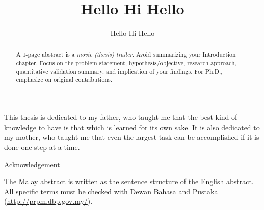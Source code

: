 \documentclass[oneside]{utmthesis}
\begin{document}
\title{Hello Hi Hello}
\author{Hello Hi Hello}

\coverpage
\superpage
\certification
\frontmatter
\maketitle
\declaration


\begin{dedication}
This thesis is dedicated to my father, who taught me that the best kind of knowledge to have is that which is learned for its own sake. It is also dedicated to my mother, who taught me that even the largest task can be accomplished if it is done one step at a time.\
\end{dedication}

\begin{acknowledgement}
Acknowledgement
\end{acknowledgement}


\begin{abstract}
A 1-page abstract is a \emph{movie (thesis) trailer}. Avoid summarizing
your Introduction chapter. Focus on the problem statement, hypothesis/objective,
research approach, quantitative validation summary, and implication
of your findings. For Ph.D., emphasize on original contributions.
\end{abstract}

\begin{abstrak}
The Malay abstract is written as the sentence structure of the English
abstract. All specific terms must be checked with Dewan Bahasa and
Pustaka (\url{http://prpm.dbp.gov.my/}). 
\end{abstrak}


\tableofcontents
\listoftables
\listoffigures


\listofabbre
{}
\end{document}
